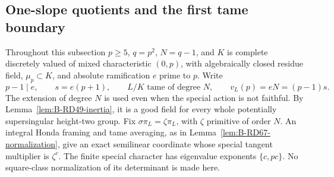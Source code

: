\subsection{One-slope quotients and the first tame boundary}

Throughout this subsection \(p\ge5\), \(q=p^2\), \(N=q-1\), and
\(K\) is complete discretely valued of mixed characteristic \((0,p)\),
with algebraically closed residue field, \(\mu_p\subset K\), and
absolute ramification \(e\) prime to \(p\). Write
\[
 p-1\mid e,\qquad s=e(p+1),\qquad
 L/K\text{ tame of degree }N,\qquad v_L(p)=eN=(p-1)s .
 \tag{B-RD69.1}
\]
The extension of degree \(N\) is used even when the special action
is not faithful. By Lemma~\ref{lem:B-RD49-inertia}, it is a good
field for every whole potentially supersingular height-two group.
Fix \(\sigma\pi_L=\zeta\pi_L\), with \(\zeta\) primitive of order \(N\).
An integral Honda framing and tame averaging, as in
Lemma~\ref{lem:B-RD67-normalization}, give an exact semilinear
coordinate whose special tangent multiplier is \(\zeta^c\).
The finite special character has eigenvalue exponents \(\{c,pc\}\).
No square-class normalization of its determinant is made here.

